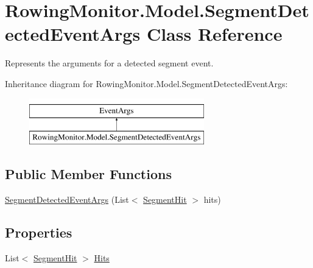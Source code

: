 \hypertarget{class_rowing_monitor_1_1_model_1_1_segment_detected_event_args}{}\section{Rowing\+Monitor.\+Model.\+Segment\+Detected\+Event\+Args Class Reference}
\label{class_rowing_monitor_1_1_model_1_1_segment_detected_event_args}


Represents the arguments for a detected segment event.  


Inheritance diagram for Rowing\+Monitor.\+Model.\+Segment\+Detected\+Event\+Args\+:\begin{figure}[H]
\begin{center}
\leavevmode
\includegraphics[height=2.000000cm]{class_rowing_monitor_1_1_model_1_1_segment_detected_event_args}
\end{center}
\end{figure}
\subsection*{Public Member Functions}
\begin{DoxyCompactItemize}
\item 
\hyperlink{class_rowing_monitor_1_1_model_1_1_segment_detected_event_args_ae0faa5e59bb3acdbfed39c7f1a44bd4d}{Segment\+Detected\+Event\+Args} (List$<$ \hyperlink{struct_rowing_monitor_1_1_model_1_1_util_1_1_segment_hit}{Segment\+Hit} $>$ hits)
\end{DoxyCompactItemize}
\subsection*{Properties}
\begin{DoxyCompactItemize}
\item 
List$<$ \hyperlink{struct_rowing_monitor_1_1_model_1_1_util_1_1_segment_hit}{Segment\+Hit} $>$ \hyperlink{class_rowing_monitor_1_1_model_1_1_segment_detected_event_args_aa2a7633ef1c061df79fb2932261e0359}{Hits}
\end{DoxyCompactItemize}


